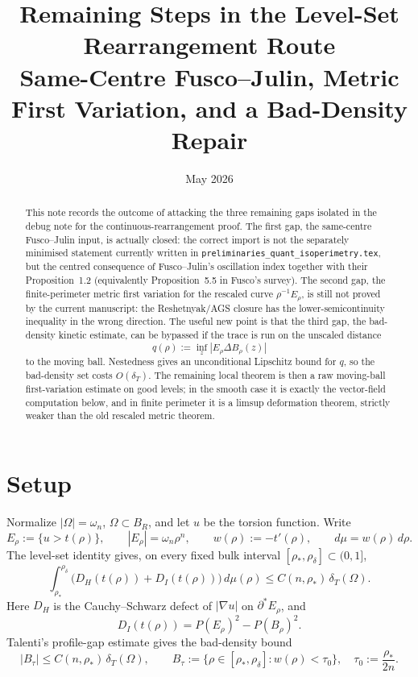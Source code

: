 \documentclass[11pt]{article}
\title{Remaining Steps in the Level-Set Rearrangement Route\\
       \large Same-Centre Fusco--Julin, Metric First Variation, and a Bad-Density Repair}
\author{}
\date{May 2026}
\theoremstyle{definition}
\newcommand{\dT}{\delta_T}
\newcommand{\rstar}{\rho_*}
\newcommand{\rdel}{\rho_\delta}
\newcommand{\wt}{w}
\newcommand{\muT}{\mu}
\begin{document}
\maketitle

\begin{abstract}
This note records the outcome of attacking the three remaining gaps isolated
in the debug note for the continuous-rearrangement proof.  The first gap,
the same-centre Fusco--Julin input, is actually closed: the correct import is
not the separately minimised statement currently written in
\texttt{preliminaries\_quant\_isoperimetry.tex}, but the centred consequence
of Fusco--Julin's oscillation index together with their Proposition~1.2
(equivalently Proposition~5.5 in Fusco's survey).  The second gap, the
finite-perimeter metric first variation for the rescaled curve
\(\rho^{-1}E_\rho\), is still not proved by the current manuscript: the
Reshetnyak/AGS closure has the lower-semicontinuity inequality in the wrong
direction.  The useful new point is that the third gap, the bad-density
kinetic estimate, can be bypassed if the trace is run on the unscaled
distance
\[
   q(\rho):=\inf_z |E_\rho\Delta B_\rho(z)|
\]
to the moving ball.  Nestedness gives an unconditional Lipschitz bound for
\(q\), so the bad-density set costs \(O(\delta_T)\).  The remaining local
theorem is then a raw moving-ball first-variation estimate on good levels;
in the smooth case it is exactly the vector-field computation below, and in
finite perimeter it is a limsup deformation theorem, strictly weaker than
the old rescaled metric theorem.
\end{abstract}

\tableofcontents

\section{Setup}

Normalize \(|\Omega|=\omega_n\), \(\Omega\subset B_R\), and let \(u\) be the
torsion function.  Write
\[
   E_\rho:=\{u>t(\rho)\},\qquad |E_\rho|=\omega_n\rho^n,
   \qquad \wt(\rho):=-t'(\rho),\qquad d\muT=\wt(\rho)\,d\rho .
\]
The level-set identity gives, on every fixed bulk interval
\([\rstar,\rdel]\subset(0,1]\),
\begin{equation}\label{eq:budget}
   \int_{\rstar}^{\rdel}\bigl(D_H(t(\rho))+D_I(t(\rho))\bigr)\,d\muT(\rho)
   \le C(n,\rstar)\,\dT(\Omega).
\end{equation}
Here \(D_H\) is the Cauchy--Schwarz defect of \(|\nabla u|\) on
\(\partial^*E_\rho\), and
\[
   D_I(t(\rho))=P(E_\rho)^2-P(B_\rho)^2 .
\]
Talenti's profile-gap estimate gives the bad-density bound
\begin{equation}\label{eq:bad-density}
   |B_\tau|\le C(n,\rstar)\,\dT(\Omega),\qquad
   B_\tau:=\{\rho\in[\rstar,\rdel]:\wt(\rho)<\tau_0\},\quad
   \tau_0:=\frac{\rstar}{2n}.
\end{equation}
\end{document}
